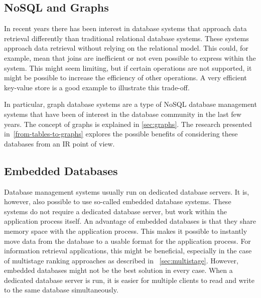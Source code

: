 \subsection{NoSQL and Graphs}
\label{sec:nosqlgraph}
In recent years there has been interest in database systems that approach data retrieval differently than traditional relational database systems. These systems approach data retrieval without relying on the relational model. This could, for example, mean that joins are inefficient or not even possible to express within the system. This might seem limiting, but if certain operations are not supported, it might be possible to increase the efficiency of other operations. A very efficient key-value store is a good example to illustrate this trade-off.

In particular, graph database systems are a type of NoSQL database management systems that have been of interest in the database community in the last few years. The concept of graphs is explained in \cref{sec:graphs}. The research presented in~\cref{from-tables-to-graphs} explores the possible benefits of considering these databases from an IR point of view.

\subsection{Embedded Databases}
Database management systems usually run on dedicated database servers. It is, however, also possible to use so-called embedded database systems. These systems do not require a dedicated database server, but work within the application process itself. An advantage of embedded databases is that they share memory space with the application process. This makes it possible to instantly move data from the database to a usable format for the application process. For information retrieval applications, this might be beneficial, especially in the case of multistage ranking approaches as described in ~\cref{sec:multistage}. However, embedded databases might not be the best solution in every case. When a dedicated database server is run, it is easier for multiple clients to read and write to the same database simultaneously. 

